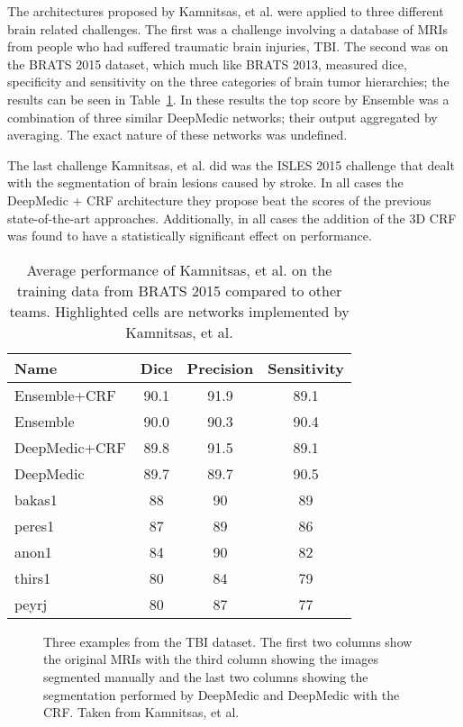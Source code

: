 \documentclass{sig-alternate}
\begin{document}
The architectures proposed by Kamnitsas, et al. were applied to three different brain related challenges. The first was a challenge involving a database of MRIs from people who had suffered traumatic brain injuries, TBI. The second was on the BRATS 2015 dataset, which much like BRATS 2013, measured dice, specificity and sensitivity on the three categories of brain tumor hierarchies; the results can be seen in Table~\ref{table:Kamnitsas}. In these results the top score by Ensemble was a combination of three similar DeepMedic networks; their output aggregated by averaging. The exact nature of these networks was undefined.

The last challenge Kamnitsas, et al. did was the ISLES 2015 challenge that dealt with the segmentation of brain lesions caused by stroke. In all cases the DeepMedic + CRF architecture they propose beat the scores of the previous state-of-the-art approaches. Additionally, in all cases the addition of the 3D CRF was found to have a statistically significant effect on performance.

\begin{table}
\begin{tabular}{l | c | c | c }
Name & Dice & Precision & Sensitivity\\
\hline
\cellcolor{blue!25}Ensemble+CRF & 90.1 & 91.9 & 89.1\\
\cellcolor{blue!25}Ensemble & 90.0 & 90.3 & 90.4\\
\cellcolor{blue!25}DeepMedic+CRF & 89.8 & 91.5 & 89.1\\
\cellcolor{blue!25}DeepMedic & 89.7 & 89.7 & 90.5\\
	bakas1 & 88 & 90 & 89\\
	peres1 & 87 & 89 & 86\\
	anon1 & 84 & 90 & 82\\
	thirs1 & 80 & 84 & 79\\
	peyrj & 80 & 87 & 77
\end{tabular}
	\caption{Average performance of Kamnitsas, et al. on the training data from BRATS 2015 compared to other teams. Highlighted cells are networks implemented by Kamnitsas, et al.}
	\label{table:Kamnitsas}
\end{table}

\begin{figure}
\centering
{}
\caption{Three examples from the TBI dataset. The first two columns show the original MRIs with the third column showing the images segmented manually and the last two columns showing the segmentation performed by DeepMedic and DeepMedic with the CRF. Taken from Kamnitsas, et al.~\cite{Kamnitsas:2017}}
\label{fig:TBIVisuals}
\end{figure}
\end{document}
